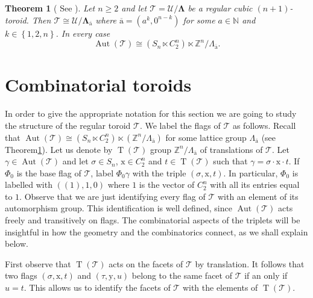 \documentclass[final]{amsart}
\theoremstyle{plain}
\newtheorem{thm}{Theorem}[section]
\theoremstyle{definition}
\theoremstyle{remark}
\numberwithin{equation}{section}
\renewcommand{\{}{\lbrace}
\renewcommand{\}}{\rbrace}
\renewcommand{\bar}{\overline}
\newcommand{\bN}{\mathbb{N}}
\newcommand{\bZ}{\mathbb{Z}}
\newcommand{\cT}{\mathcal{T}}
\newcommand{\cU}{\mathcal{U}}
\newcommand{\LL}{\Lambda}
\newcommand{\bLL}{\mathbf{\Lambda}}
\newcommand{\cyvec}[1]{{\mathrm{#1}}}
\newcommand{\vx}{\cyvec{x}}
\newcommand{\vy}{\cyvec{y}}
\newcommand{\va}{\cyvec{a}}
\DeclareMathOperator{\aut}{Aut} \DeclareMathOperator{\autp}{\aut^{+}}
\newcommand{\cyctwo}[1][n]{ C_{2}^{#1} }
\DeclareMathOperator{\tras}{T}
\newcommand{\UoverL}{\cU/\bLL}
\begin{document}
\begin{thm}[ See {\cite[1D,6D1 and 6D4]{McMullenSchulte_2002_AbstractRegularPolytopes}}]
  \label{thm:toroids}
  Let $n \geq 2$ and let $\cT = \UoverL$ be a regular cubic $(n+1)$-toroid. Then $\cT \cong \cU/\mathbf{\LL_{\bar{\va}}}$ where $\bar{\va} = (a^{k}, 0^{n-k})$ for some $a \in \bN$ and $k \in \left\{ 1,2,n \right\}$.
  In every case \[ \aut(\cT) \cong (S_{n} \ltimes C_{2}^{n}) \ltimes \bZ^{n}/\LL_{\bar{\va}}.  \] 
\end{thm} \section{Combinatorial toroids}
\label{sect:combinatorialToroids}










In order to give the appropriate notation for this section we are going to study the structure of the regular toroid $\cT$. We label the flags of $\cT$ as follows. Recall that $\aut(\cT) \cong (S_{n} \ltimes \cyctwo) \ltimes ( \bZ^{n}/\LL_{\bar{\va}})$ for some lattice group $\LL_{\bar{\va}}$ (see Theorem\nobreakspace \ref {thm:toroids}).
Let us denote by $\tras(\cT)$ group $\bZ^{n}/\LL_{\bar{\va}}$ of translations of $\cT$.
Let $\gamma \in \aut(\cT)$ and let $\sigma \in S_{n}$, $\vx \in \cyctwo$ and $t \in \tras (\cT)$ such that $\gamma = \sigma \cdot \vx \cdot t$. 
If $\Phi_{0}$ is the base flag of $\cT$, label $\Phi_{0} \gamma $ with the triple $(\sigma, \vx, t)$. 
In particular, $\Phi_{0}$ is labelled with $((1), \cyvec{1}, 0)$ where $\cyvec{1}$ is the vector of $\cyctwo$ with all its entries equal to $1$.
Observe that we are just identifying every flag of $\cT$ with an element of its automorphism group. 
This identification is well defined, since $\aut(\cT)$ acts freely and transitively on flags. 
The combinatorial aspects of the triplets will be insightful in how the geometry and the combinatorics connect, as we shall explain below.

First observe that $\tras (\cT)$ acts on the facets of $\cT$ by translation. 
It follows that two flags  $(\sigma, \vx, t)$ and $(\tau, \vy, u)$ belong to the same facet of $\cT$ if an only if $u=t$. 
This allows us to identify the facets of $\cT$ with the elements of $\tras (\cT)$.
\end{document}
